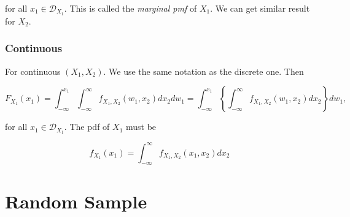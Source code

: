 \documentclass{article}
\begin{document}
                for all $ x_{1} \in \mathcal{D}_{X_{1}} $. This is called the \textit{marginal pmf} of $ X_{1} $.
                We can get similar result for $ X_{2} $.

            \subsubsection{Continuous}

                For continuous $ (X_{1}, X_{2}) $. We use the same notation as the discrete one. Then

                \begin{equation*}
                    F_{X_{1}} (x_{1}) = \int_{ -\infty }^{ x_{1} } \int_{
                        -\infty }^{ \infty } f_{X_{1}, X_{2}} (w_{1}, x_{2}) d x_{2} d w_{1}
                        = \int_{ -\infty }^{ x_{1} } \left\{
                            \int_{ -\infty }^{ \infty } f_{X_{1}, X_{2}} (w_{1}, x_{2}) d x_{2}
                            \right\} d w_{1},
                \end{equation*}

                for all $ x_{1} \in \mathcal{D}_{X_{1}} $. The pdf of $ X_{1} $ must be

                \begin{equation*}
                     f_{X_{1}}(x_{1}) = \int_{ -\infty }^{ \infty } f_{X_{1}, X_{2}} (x_{1}, x_{2}) d x_{2}
                \end{equation*}

    \section{Random Sample}
\end{document}
